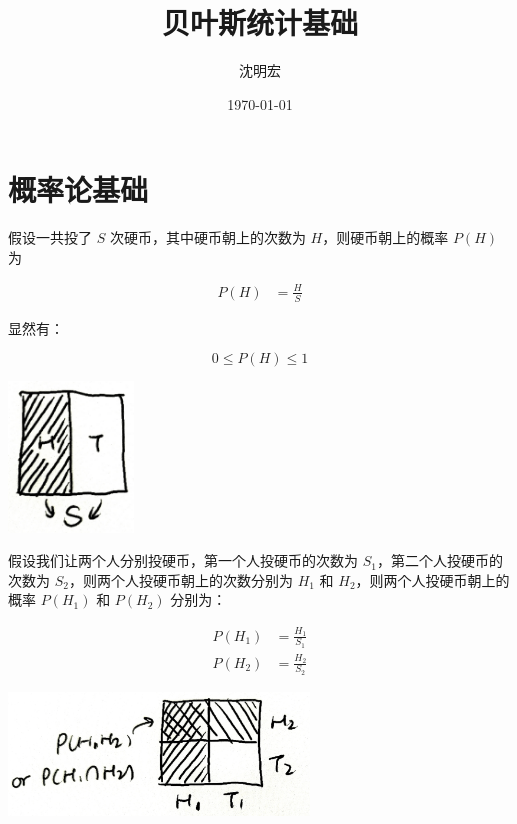 \documentclass[UTF8]{ctexart}
\title{贝叶斯统计基础}
\author{沈明宏}
\date{\today}
\begin{document}
\maketitle
\tableofcontents

\newpage
\section{概率论基础}

假设一共投了 $S$ 次硬币，其中硬币朝上的次数为 $H$，则硬币朝上的概率 $P(H)$ 为

\begin{equation}
	\begin{aligned}
		P(H) & = \frac{H}{S}
	\end{aligned}
\end{equation}

显然有：

\begin{equation}
	0 \leq P(H) \leq 1
\end{equation}

\begin{center}
	\includegraphics[width=0.25\textwidth]{fig1.jpg}
\end{center}

假设我们让两个人分别投硬币，第一个人投硬币的次数为 $S_1$，第二个人投硬币的次数为 $S_2$，则两个人投硬币朝上的次数分别为 $H_1$ 和 $H_2$，则两个人投硬币朝上的概率 $P(H_1)$ 和 $P(H_2)$ 分别为：

\begin{equation}
	\begin{aligned}
		P(H_1) & = \frac{H_1}{S_1} \\
		P(H_2) & = \frac{H_2}{S_2}
	\end{aligned}
\end{equation}

\begin{center}
	\includegraphics[width=0.6\textwidth]{fig2.jpg}
\end{center}
\end{document}
